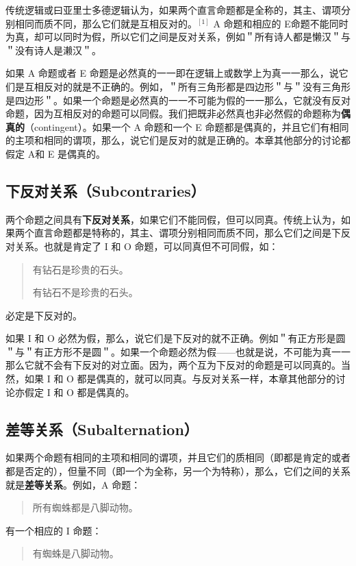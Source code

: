 传统逻辑或曰亚里士多德逻辑认为，如果两个直言命题都是全称的，其主、谓项分别相同而质不同，那么它们就是互相反对的。$^{[1]}$ A 命题和相应的 E命题不能同时为真，却可以同时为假，所以它们之间是反对关系，例如＂所有诗人都是懒汉＂与＂没有诗人是濑汉＂。

如果 A 命题或者 E 命题是必然真的一一即在逻辑上或数学上为真一一那么，说它们是互相反对的就是不正确的。例如，＂所有三角形都是四边形＂与＂没有三角形是四边形＂。如果一个命题是必然真的一一不可能为假的一一那么，它就没有反对命题，因为互相反对的命题可以同假。我们把既非必然真也非必然假的命题称为\textbf{偶真的}（contingent）。如果一个 A 命题和一个 E 命题都是偶真的，并且它们有相同的主项和相同的谓项，那么，说它们是反对的就是正确的。本章其他部分的讨论都假定 A和 E 是偶真的。

\subsection{下反对关系（Subcontraries）}
两个命题之间具有\textbf{下反对关系}，如果它们不能同假，但可以同真。传统上认为，如果两个直言命题都是特称的，其主、谓项分别相同而质不同，那么它们之间是下反对关系。也就是肯定了 I 和 O 命题，可以同真但不可同假，如：

\begin{quote}
有钻石是珍贵的石头。

有钻石不是珍贵的石头。
\end{quote}

必定是下反对的。

如果 I 和 O 必然为假，那么，说它们是下反对的就不正确。例如＂有正方形是圆＂与＂有正方形不是圆＂。如果一个命题必然为假——也就是说，不可能为真一一那么它就不会有下反对的对立面。因为，两个互为下反对的命题是可以同真的。当然，如果 I 和 O 都是偶真的，就可以同真。与反对关系一样，本章其他部分的讨论亦假定 I 和 O 都是偶真的。

\subsection{差等关系（Subalternation）}
如果两个命题有相同的主项和相同的谓项，并且它们的质相同（即都是肯定的或者都是否定的），但量不同（即一个为全称，另一个为特称），那么，它们之间的关系就是\textbf{差等关系}。例如，A 命题：

\begin{quote}
所有蜘蛛都是八脚动物。
\end{quote}

有一个相应的 I 命题：

\begin{quote}
有蜘蛛是八脚动物。
\end{quote}

